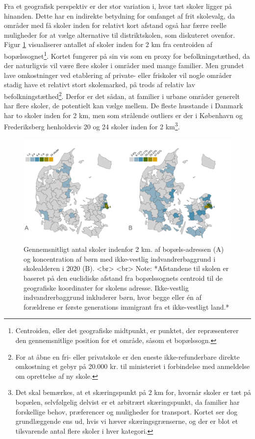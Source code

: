 \documentclass[
]{book}
\begin{document}
Fra et geografisk perspektiv er der stor variation i, hvor tæt skoler ligger på hinanden. Dette har en indirekte betydning for omfanget af frit skolevalg, da områder med få skoler inden for relativt kort afstand også har færre reelle muligheder for at vælge alternative til distriktskolen, som diskuteret ovenfor. Figur \ref{fig:fig-3-1} visualiserer antallet af skoler inden for 2 km fra centroiden af bopælssognet\footnote{Centroiden, eller det geografiske midtpunkt, er punktet, der repræsenterer den gennemsnitlige position for et område, såsom et bopælssogn.}. Kortet fungerer på sin vis som en proxy for befolkningstæthed, da der naturligvis vil være flere skoler i områder med mange familier. Men grundet lave omkostninger ved etablering af private- eller friskoler vil nogle områder stadig have et relativt stort skolemarked, på trods af relativ lav befolkningstæthed\footnote{For at åbne en fri- eller privatskole er den eneste ikke-refunderbare direkte omkostning et gebyr på 20.000 kr. til ministeriet i forbindelse med anmeldelse om oprettelse af ny skole.}. Derfor er det sådan, at familier i urbane områder generelt har flere skoler, de potentielt kan vælge mellem. De fleste husstande i Danmark har to skoler inden for 2 km, men som strålende outliers er der i København og Frederiksberg henholdsvis 20 og 24 skoler inden for 2 km\footnote{Det skal bemærkes, at et skæringspunkt på 2 km for, hvornår skoler er tæt på bopælen, selvfølgelig delvist er et arbitrært skæringspunkt, da familier har forskellige behov, præferencer og muligheder for transport. Kortet ser dog grundlæggende ens ud, hvis vi hæver skæringsgrænserne, og der er blot et tilsvarende antal flere skoler i hver kategori.}.

\begin{figure}
\includegraphics[width=1\linewidth]{images/figur_3_1c_distance_antal} \caption{Gennemsnitligt antal skoler indenfor 2 km. af bopæls-adressen (A) og koncentration af børn med ikke-vestlig indvandrerbaggrund i skolealderen i 2020 (B). <br> <br> Note: *Afstandene til skolen er baseret på den euclidiske afstand fra bopælssognets centroid til de geografiske koordinater for skolens adresse. Ikke-vestlig indvandrerbaggrund inkluderer børn, hvor begge eller én af forældrene er første generations immigrant fra et ikke-vestligt land.*}\label{fig:fig-3-1}
\end{figure}
\end{document}
